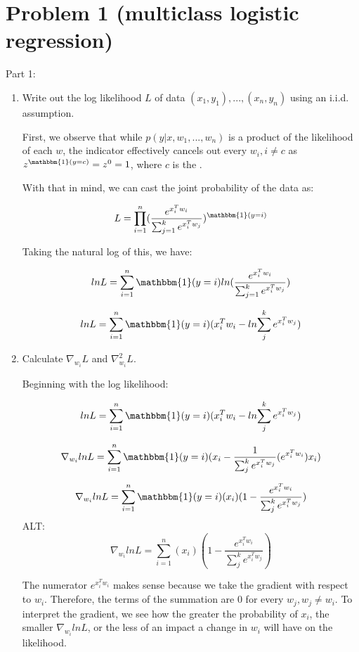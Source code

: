 \documentclass[11pt]{article}
\begin{document}

\section*{Problem 1 (multiclass logistic regression)}

Part 1:
\begin{enumerate}
\item Write out the log likelihood $L$ of data $(x_1, y_1), . . . , (x_n, y_n)$ using an i.i.d. assumption.

First, we observe that while $p(y|x, w_1, ..., w_n)$ is a product of the likelihood of each $w$, the indicator effectively cancels out every $w_i, i \neq c$ as $z^{\mathbbm{1}(y = c)} = z^0 = 1$, where $c$ is the .

With that in mind, we can cast the joint probability of the data as:

\[
L = \prod_{i=1}^{n} (\frac{e^{x_i^Tw_i}}{\sum_{j=1}^k e^{x_i^Tw_j}})^{\mathbbm{1}(y = i)}
\]

Taking the natural log of this, we have:

\[
lnL = \sum_{i=1}^{n} \mathbbm{1}(y = i) ln(\frac{e^{x_i^Tw_i}}{\sum_{j=1}^k e^{x_i^Tw_j}})
\]

\[
lnL = \sum_{i=1}^{n} \mathbbm{1}(y = i) (x_i^Tw_i - ln{\sum_j^k e^{x_i^Tw_j}})
\]

\item Calculate $\nabla_{w_i} L$ and $\nabla^2_{w_i} L$.

Beginning with the log likelihood:

\[
lnL = \sum_{i=1}^{n} \mathbbm{1}(y = i) (x_i^Tw_i - ln{\sum_j^k e^{x_i^Tw_j}})
\]

\[
\nabla_{w_i}lnL = \sum_{i=1}^{n} \mathbbm{1}(y = i) (x_i - \frac{1}{\sum_j^k e^{x_i^Tw_j}} (e^{x_i^Tw_i}) x_i)
\]

\[
\nabla_{w_i}lnL = \sum_{i=1}^{n} \mathbbm{1}(y = i)(x_i) (1 - \frac{e^{x_i^Tw_i}}{\sum_j^k e^{x_i^Tw_j}})
\]
ALT:
\[
\nabla_{w_i}lnL = \sum_{i=1}^{n}(x_i) (1 - \frac{e^{x_i^Tw_i}}{\sum_j^k e^{x_i^Tw_j}})
\]

The numerator $e^{x_i^Tw_i}$ makes sense because we take the gradient with respect to $w_i$. Therefore, the terms of the summation are 0 for every $w_j, w_j \neq w_i$.
To interpret the gradient, we see how the greater the probability of $x_i$, the smaller $\nabla_{w_i}lnL$, or the less of an impact a change in $w_i$ will have on the likelihood.


\end{enumerate}
\end{document}
